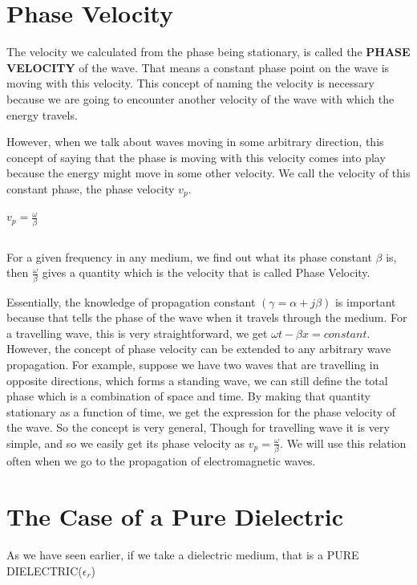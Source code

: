 \section{\textbf{Phase Velocity}}
The velocity we calculated from the phase being stationary, is called the \textbf{PHASE VELOCITY} of the wave. That means a constant phase point on the wave is moving with this velocity. This concept of naming the velocity is necessary because we are going to encounter another velocity of the wave with which the energy travels.

However, when we talk about waves moving in some arbitrary direction, this concept of saying that the phase is moving with this velocity comes into play because the energy might move in some other velocity. We call the velocity of this constant phase, the phase velocity $ v_p $.

\begin{center}
$ v_p=\frac{\omega}{\beta} $
\end{center}
\begin{equation}\end{equation}

For a given frequency in any medium, we find out what its phase constant $\beta  $ is, then $\frac{\omega}{\beta}$ gives a quantity which is the velocity that is called Phase Velocity.

Essentially, the knowledge of propagation constant $(\gamma=\alpha+j\beta)$ is important because that tells the phase of the wave when it travels through the medium.
For a travelling wave, this is very straightforward, we get $ \omega t-\beta x=constant $. However, the concept of phase velocity can be extended to any arbitrary wave propagation. For example, suppose we have two waves that are travelling in opposite directions, which forms a standing wave, we can still define the total phase which is a combination of space and time. By making that quantity stationary as a function of time, we get the expression for the phase velocity of the wave. So the concept is very general, Though for travelling wave it is very simple, and so we easily get its phase velocity as $v_{p} = \frac{\omega}{\beta}.$ We will use this relation often when we go to the propagation of electromagnetic waves.

\section{\textbf{The Case of a Pure Dielectric}}

As we have seen earlier, if we take a dielectric medium, that is a PURE DIELECTRIC($\epsilon_{r}$)

